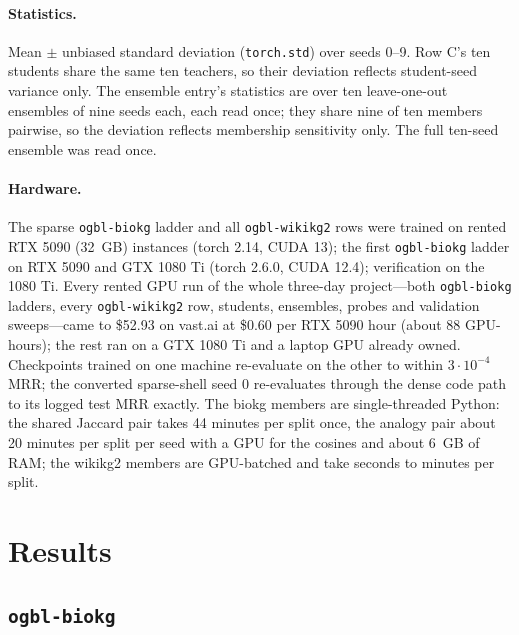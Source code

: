 \documentclass[11pt,a4paper]{article}
\begin{document}
\paragraph{Statistics.}
Mean $\pm$ unbiased standard deviation (\texttt{torch.std}) over seeds
0--9. Row C's ten students share the same ten teachers, so their
deviation reflects student-seed variance only. The ensemble entry's
statistics are over ten leave-one-out ensembles of nine seeds each, each
read once; they share nine of ten members pairwise, so the deviation
reflects membership sensitivity only. The full ten-seed ensemble was
read once.

\paragraph{Hardware.}
The sparse \texttt{ogbl-biokg} ladder and all \texttt{ogbl-wikikg2} rows
were trained on rented RTX 5090 (32~GB) instances (torch 2.14, CUDA 13);
the first \texttt{ogbl-biokg} ladder on RTX 5090 and GTX 1080 Ti (torch
2.6.0, CUDA 12.4); verification on the 1080 Ti. Every rented GPU run of the whole three-day project---both
\texttt{ogbl-biokg} ladders, every \texttt{ogbl-wikikg2} row, students,
ensembles, probes and validation sweeps---came to \$52.93 on vast.ai at
\$0.60 per RTX 5090 hour (about 88 GPU-hours); the rest ran on a GTX
1080 Ti and a laptop GPU already owned.
Checkpoints trained on
one machine re-evaluate on the other to within $3\cdot10^{-4}$ MRR; the
converted sparse-shell seed 0 re-evaluates through the dense code path to
its logged test MRR exactly. The biokg members are single-threaded Python: the shared Jaccard pair
takes 44 minutes per split once, the analogy pair about 20 minutes per
split per seed with a GPU for the cosines and about 6~GB of RAM; the
wikikg2 members are GPU-batched and take seconds to minutes per split.

\section{Results}
\label{sec:results}

\subsection{\texttt{ogbl-biokg}}
\end{document}
